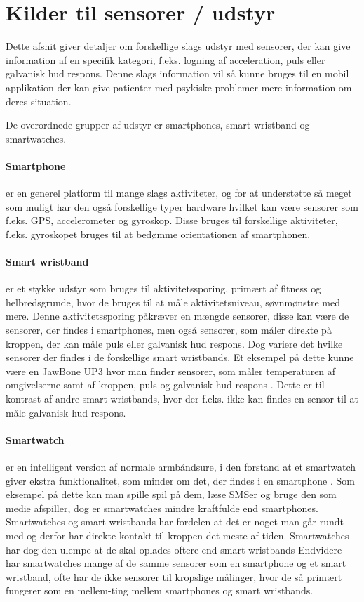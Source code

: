 \section{Kilder til sensorer / udstyr}\label{sec:kilder-til-sensorer}
Dette afsnit giver detaljer om forskellige slags udstyr med sensorer, der kan give information af en specifik kategori, f.eks. logning af acceleration, puls eller galvanisk hud respons.
Denne slags information vil så kunne bruges til en mobil applikation der kan give patienter med psykiske problemer mere information om deres situation.

De overordnede grupper af udstyr er smartphones, smart wristband og smartwatches. 

\paragraph{Smartphone}
 er en generel platform til mange slags aktiviteter, og for at understøtte så meget som muligt har den også forskellige typer hardware hvilket kan være sensorer som f.eks. GPS, accelerometer og gyroskop. Disse bruges til forskellige aktiviteter, f.eks. gyroskopet bruges til at bedømme orientationen af smartphonen. 

\paragraph{Smart wristband} %
 er et stykke udstyr som bruges til aktivitetssporing, primært af fitness og helbredsgrunde, hvor de bruges til at måle aktivitetsniveau, søvnmønstre med mere.
Denne aktivitetssporing påkræver en mængde sensorer, disse kan være de sensorer, der findes i smartphones, men også sensorer, som måler direkte på kroppen, der kan måle puls eller galvanisk hud respons. 
Dog variere det hvilke sensorer der findes i de forskellige smart wristbands.
Et eksempel på dette kunne være en JawBone UP3 hvor man finder sensorer, som måler temperaturen af omgivelserne samt af kroppen, puls og galvanisk hud respons \citep{misc:jawboneup3sensors}. 
Dette er til kontrast af andre smart wristbands, hvor der f.eks. ikke kan findes en sensor til at måle galvanisk hud respons.

\paragraph{Smartwatch}
 er en intelligent version af normale armbåndsure, i den forstand at et smartwatch giver ekstra funktionalitet, som minder om det, der findes i en smartphone \citep{msic:smartwatchstate}. 
Som eksempel på dette kan man spille spil på dem, læse SMSer og bruge den som medie afspiller, dog er smartwatches mindre kraftfulde end smartphones. 
Smartwatches og smart wristbands har fordelen at det er noget man går rundt med og derfor har direkte kontakt til kroppen det meste af tiden. Smartwatches har dog den ulempe at de skal oplades oftere end smart wristbands
Endvidere har smartwatches mange af de samme sensorer som en smartphone og et smart wristband, ofte har de ikke sensorer til kropslige målinger, hvor de så primært fungerer som en mellem-ting mellem smartphones og smart wristbands.

